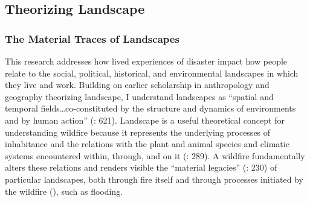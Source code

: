\documentclass[
]{article}
\begin{document}
\subsection{Theorizing Landscape}\label{theorizing-landscape}

\subsubsection{The Material Traces of Landscapes}\label{the-material-traces-of-landscapes}

This research addresses how lived experiences of disaster impact how people relate to the social, political, historical, and environmental landscapes in which they live and work. Building on earlier scholarship in anthropology and geography theorizing landscape, I understand landscapes as ``spatial and temporal fields\ldots co-constituted by the structure and dynamics of environments and by human action'' (: 621). Landscape is a useful theoretical concept for understanding wildfire because it represents the underlying processes of inhabitance and the relations with the plant and animal species and climatic systems encountered within, through, and on it (: 289). A wildfire fundamentally alters these relations and renders visible the ``material legacies'' (: 230) of particular landscapes, both through fire itself and through processes initiated by the wildfire (), such as flooding.
\end{document}
